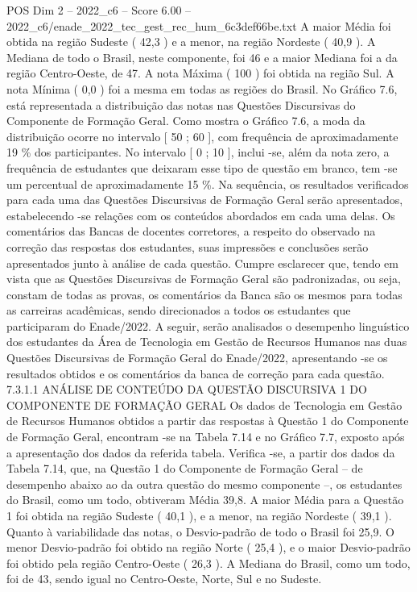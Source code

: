 \begin{textsample}{POS Dim 2 – 2022\_c6 – Score 6.00 – 2022\_c6/enade\_2022\_tec\_gest\_rec\_hum\_6c3def66be.txt}
A maior Média foi obtida na região Sudeste ( 42,3 ) e a menor, na região Nordeste ( 40,9 ).
A Mediana de todo o Brasil, neste componente, foi 46 e a maior Mediana foi a da região Centro-Oeste, de 47.
A nota Máxima ( 100 ) foi obtida na região Sul.
A nota Mínima ( 0,0 ) foi a mesma em todas as regiões do Brasil.
No Gráfico 7.6, está representada a distribuição das notas nas Questões Discursivas do Componente de Formação Geral.
Como mostra o Gráfico 7.6, a moda da distribuição ocorre no intervalo [ 50 ; 60 ], com frequência de aproximadamente 19 \% dos participantes.
No intervalo [ 0 ; 10 ], inclui -se, além da nota zero, a frequência de estudantes que deixaram esse tipo de questão em branco, tem -se um percentual de aproximadamente 15 \%.
Na sequência, os resultados verificados para cada uma das Questões Discursivas de Formação Geral serão apresentados, estabelecendo -se relações com os conteúdos abordados em cada uma delas.
Os comentários das Bancas de docentes corretores, a respeito do observado na correção das respostas dos estudantes, suas impressões e conclusões serão apresentados junto à análise de cada questão.
Cumpre esclarecer que, tendo em vista que as Questões Discursivas de Formação Geral são padronizadas, ou seja, constam de todas as provas, os comentários da Banca são os mesmos para todas as carreiras acadêmicas, sendo direcionados a todos os estudantes que participaram do Enade/2022.
A seguir, serão analisados o desempenho linguístico dos estudantes da Área de Tecnologia em Gestão de Recursos Humanos nas duas Questões Discursivas de Formação Geral do Enade/2022, apresentando -se os resultados obtidos e os comentários da banca de correção para cada questão. 7.3.1.1 ANÁLISE DE CONTEÚDO DA QUESTÃO DISCURSIVA 1 DO COMPONENTE DE FORMAÇÃO GERAL Os dados de Tecnologia em Gestão de Recursos Humanos obtidos a partir das respostas à Questão 1 do Componente de Formação Geral, encontram -se na Tabela 7.14 e no Gráfico 7.7, exposto após a apresentação dos dados da referida tabela.
Verifica -se, a partir dos dados da Tabela 7.14, que, na Questão 1 do Componente de Formação Geral – de desempenho abaixo ao da outra questão do mesmo componente –, os estudantes do Brasil, como um todo, obtiveram Média 39,8.
A maior Média para a Questão 1 foi obtida na região Sudeste ( 40,1 ), e a menor, na região Nordeste ( 39,1 ).
Quanto à variabilidade das notas, o Desvio-padrão de todo o Brasil foi 25,9.
O menor Desvio-padrão foi obtido na região Norte ( 25,4 ), e o maior Desvio-padrão foi obtido pela região Centro-Oeste ( 26,3 ).
A Mediana do Brasil, como um todo, foi de 43, sendo igual no Centro-Oeste, Norte, Sul e no Sudeste.

\end{textsample}
